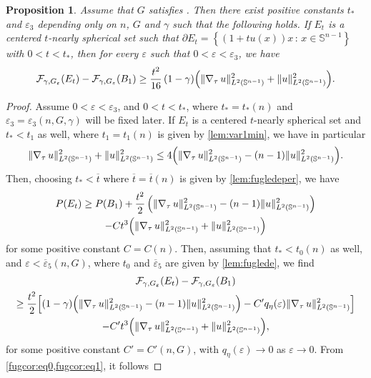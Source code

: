 \documentclass[JEP,XML,SOM,Unicode,published]{cedram}
\newcommand{\sep}{\,:\,}
\numberwithin{equation}{section}
\theoremstyle{plain}
\newtheorem{prp}[thm]{Proposition}
\theoremstyle{definition}
\newcommand{\bbS}{\mathbb{S}}
\newcommand{\calF}{{\mathcal{F}}}
\let\eps\varepsilon
\let\ol\overline
\newcommand{\grad}{\nabla}
\DeclarePairedDelimiter{\norm}{\lVert}{\rVert}
\begin{document}
\begin{prp}\label{prp:fuglede2}
Assume that $G$ satisfies .
Then there exist positive constants $t_*$ and $\eps_3$ depending only on $n$, $G$ and $\gamma$ such
that the following holds. If $E_t$ is a centered $t$-nearly spherical set such that $\partial
E_t=\left\{(1+tu(x))x\sep x\in\bbS^{n-1}\right\}$ with $0<t<t_*$, then for every $\eps$ such that $0<\eps<\eps_3$, we
have
\[
\calF_{\gamma,G_\eps}(E_t)-\calF_{\gamma,G_\eps}(B_1)
\geq \frac{t^2}{16}\,(1-\gamma)
\Bigl(\norm{\grad_\tau\,u}_{L^2(\bbS^{n-1})}^2+\norm{u}_{L^2(\bbS^{n-1})}^2 \Bigr).
\]
\end{prp}

\begin{proof}
Assume $0<\eps<\eps_3$, and $0<t<t_*$, where $t_*=t_*(n)$ and~$\eps_3=\eps_3(n,G,\gamma)$ will be
fixed later.
If $E_t$ is a centered $t$-nearly spherical set and $t_*<t_1$ as well, where $t_1=t_1(n)$ is given
by \cref{lem:var1min}, we have in particular
\begin{equation}\label{fugcor:eq0}
\norm{\grad_\tau\, u}_{L^2(\bbS^{n-1})}^2+\norm{u}_{L^2(\bbS^{n-1})}^2
\leq 4\Bigl(\norm{\grad_\tau\,u}_{L^2(\bbS^{n-1})}^2-(n-1)\norm{u}_{L^2(\bbS^{n-1})}^2 \Bigr).
\end{equation}
Then, choosing $t_*<\ol{t}$ where $\ol{t}=\ol{t}(n)$ is given by \cref{lem:fugledeper}, we
have
\begin{multline*}
P(E_t)\geq
P(B_1)+\frac{t^2}{2}\left(\norm{\grad_\tau\,u}_{L^2(\bbS^{n-1})}^2
-(n-1)\norm{u}_{L^2(\bbS^{n-1})}^2\right)\\
-Ct^3 \Bigl(\norm{\grad_\tau\, u}_{L^2(\bbS^{n-1})}^2+\norm{u}_{L^2(\bbS^{n-1})}^2 \Bigr)
\end{multline*}
for some positive constant $C=C(n)$.
Then, assuming that $t_*<t_0(n)$ as well, and $\eps<\ol{\eps}_5(n,G)$, where $t_0$ and
$\ol{\eps}_5$ are given by \cref{lem:fuglede}, we find
\begin{multline}\label{fugcor:eq1}
\calF_{\gamma,G_\eps}(E_t)-\calF_{\gamma,G_\eps}(B_1)\\
\geq \frac{t^2}{2}
\Big[ (1-\gamma)\Big(\norm{\grad_\tau\,u}_{L^2(\bbS^{n-1})}^2-(n-1)\norm{u}_{L^2(\bbS^{n-1})}^2\Big)
-C'q_\eta(\eps)\norm{\grad_\tau\,u}_{L^2(\bbS^{n-1})}^2\Big]\\
-C't^3\Bigl(\norm{\grad_\tau\,u}_{L^2(\bbS^{n-1})}^2+\norm{u}_{L^2(\bbS^{n-1})}^2\Bigr),
\end{multline}
for some positive constant $C'=C'(n,G)$, with $q_\eta(\eps)\to 0$ as $\eps\to 0$.
From \cref{fugcor:eq0,fugcor:eq1}, it follows

\end{proof}
\end{document}
